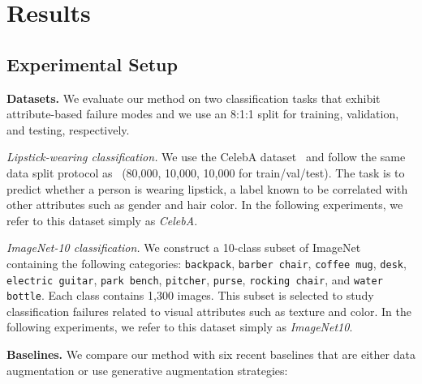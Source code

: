 \documentclass[10pt]{article} %
\begin{document}
\section{Results}





\subsection{Experimental Setup}
\textbf{Datasets.}  
We evaluate our method on two classification tasks that exhibit attribute-based failure modes and we use an 8:1:1 split for training, validation, and testing, respectively.

\textit{Lipstick-wearing classification.} 
We use the CelebA dataset~\citep{liu2015faceattributes} and follow the same data split protocol as~\citep{chen2023hibug} (80{,}000, 10{,}000, 10{,}000 for train/val/test). The task is to predict whether a person is wearing lipstick, a label known to be correlated with other attributes such as gender and hair color. In the following experiments, we refer to this dataset simply as \emph{CelebA}.

\textit{ImageNet-10 classification.}  
We construct a 10-class subset of ImageNet~\citep{deng2009imagenet} containing the following categories:  
\texttt{backpack}, \texttt{barber chair}, \texttt{coffee mug}, \texttt{desk}, \texttt{electric guitar}, \texttt{park bench}, \texttt{pitcher}, \texttt{purse}, \texttt{rocking chair}, and \texttt{water bottle}. Each class contains 1,300 images. This subset is selected to study classification failures related to visual attributes such as texture and color. In the following experiments, we refer to this dataset simply as \emph{ImageNet10}.

\noindent\textbf{Baselines.} We compare our method with six recent baselines that are either data augmentation or use generative augmentation strategies:
\end{document}
